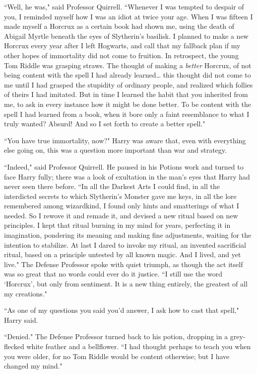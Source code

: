 ``Well, he was," said Professor Quirrell. ``Whenever I was tempted to despair of you, I reminded myself how I was an idiot at twice your age. When I was fifteen I made myself a Horcrux as a certain book had shown me, using the death of Abigail Myrtle beneath the eyes of Slytherin's basilisk. I planned to make a new Horcrux every year after I left Hogwarts, and call that my fallback plan if my other hopes of immortality did not come to fruition. In retrospect, the young Tom Riddle was grasping straws. The thought of making a \emph{better} Horcrux, of not being content with the spell I had already learned{\ldots} this thought did not come to me until I had grasped the stupidity of ordinary people, and realized which follies of theirs I had imitated. But in time I learned the habit that you inherited from me, to ask in every instance how it might be done better. To be content with the spell I had learned from a book, when it bore only a faint resemblance to what I truly wanted? Absurd! And so I set forth to create a better spell."

``You have true immortality, now?" Harry was aware that, even with everything else going on, this was a question more important than war and strategy.

``Indeed," said Professor Quirrell. He paused in his Potions work and turned to face Harry fully; there was a look of exultation in the man's eyes that Harry had never seen there before. ``In all the Darkest Arts I could find, in all the interdicted secrets to which Slytherin's Monster gave me keys, in all the lore remembered among wizardkind, I found only hints and smatterings of what I needed. So I rewove it and remade it, and devised a new ritual based on new principles. I kept that ritual burning in my mind for years, perfecting it in imagination, pondering its meaning and making fine adjustments, waiting for the intention to stabilize. At last I dared to invoke my ritual, an invented sacrificial ritual, based on a principle untested by all known magic. And I lived, and yet live." The Defense Professor spoke with quiet triumph, as though the act itself was so great that no words could ever do it justice. ``I still use the word `Horcrux', but only from sentiment. It is a new thing entirely, the greatest of all my creations."

``As one of my questions you said you'd answer, I ask how to cast that spell," Harry said.

``Denied." The Defense Professor turned back to his potion, dropping in a grey-flecked white feather and a bellflower. ``I had thought perhaps to teach you when you were older, for no Tom Riddle would be content otherwise; but I have changed my mind."

